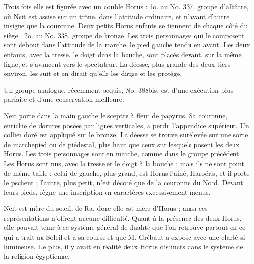 \documentclass[letterpaper,twocolumn,openany,nodeprecatedcode]{dndbook}
\begin{document}
Trois fois elle est figurée avec un double Horus : 1o. au No. 337, groupe d'albâtre, où Neit est assise sur un trône, dans l'attitude ordinaire, et n'ayant d'autre insigne que la couronne. Deux petits Horus enfants se tiennent de chaque côté du siège ; 2o. au No. 338, groupe de bronze. Les trois personnages qui le composent sont debout dans l'attitude de la marche, le pied gauche tendu en avant. Les deux enfants, avec la tresse, le doigt dans la bouche, sont placés devant, sur la même ligne, et s'avancent vers le spectateur. La déesse, plus grande des deux tiers environ, les suit et on dirait qu'elle les dirige et les protège.

Un groupe analogue, récemment acquis, No. 388bis, est d'une exécution plus parfaite et d'une conservation meilleure.

Neit porte dans la main gauche le sceptre à fleur de papyrus. Sa couronne, enrichie de dorures posées par lignes verticales, a perdu l'appendice supérieur. Un collier doré est appliqué sur le bronze. La déesse se trouve surélevée sur une sorte de marchepied ou de piédestal, plus haut que ceux sur lesquels posent les deux Horus. Les trois personnages sont en marche, comme dans le groupe précédent. Les Horus sont nus, avec la tresse et le doigt à la bouche ; mais ils ne sont point de même taille : celui de gauche, plus grand, est Horus l'ainé, Haroëris, et il porte le pschent ; l'autre, plus petit, n'est décoré que de la couronne du Nord. Devant leurs pieds, règne une inscription en caractères excessivement menus.

Neit est mère du soleil, de Ra, donc elle est mère d'Horus ; ainsi ces représentations n'offrent aucune difficulté. Quant à-la présence des deux Horus, elle pouvait tenir à ce système général de dualité que l'on retrouve partout en ce qui a trait au Soleil et à sa course et que M. Grébaut a exposé avec une clarté si lumineuse. De plus, il y avait en réalité deux Horus distincts dans le système de la religion égyptienne.
\end{document}
